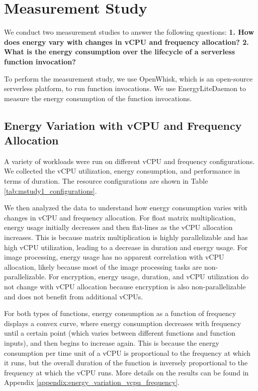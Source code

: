\documentclass[times, 10pt,twocolumn]{article}
\begin{document}
\section{Measurement Study}

We conduct two measurement studies to answer the following questions: \textbf{1. How does energy vary with changes in vCPU and frequency allocation? 2. What is the energy consumption over the lifecycle of a serverless function invocation?}

To perform the measurement study, we use OpenWhisk, which is an open-source serverless platform, to run function invocations. We use EnergyLiteDaemon to measure the energy consumption of the function invocations.

\subsection{Energy Variation with vCPU and Frequency Allocation}

A variety of workloads were run on different vCPU and frequency configurations. We collected the vCPU utilization, energy consumption, and performance in terms of duration. The resource configurations are shown in Table \ref{tab:mstudy1_configurations}.

We then analyzed the data to understand how energy consumption varies with changes in vCPU and frequency allocation. For float matrix multiplication, energy usage initially decreases and then flat-lines as the vCPU allocation increases. This is because matrix multiplication is highly parallelizable and has high vCPU utilization, leading to a decrease in duration and energy usage. For image processing, energy usage has no apparent correlation with vCPU allocation, likely because most of the image processing tasks are non-parallelizable. For encryption, energy usage, duration, and vCPU utilization do not change with vCPU allocation because encryption is also non-parallelizable and does not benefit from additional vCPUs.

For both types of functions, energy consumption as a function of frequency displays a convex curve, where energy consumption decreases with frequency until a certain point (which varies between different functions and function inputs), and then begins to increase again. This is because the energy consumption per time unit of a vCPU is proportional to the frequency at which it runs, but the overall duration of the function is inversely proportional to the frequency at which the vCPU runs. More details on the results can be found in Appendix \ref{appendix:energy_variation_vcpu_frequency}.
\end{document}

